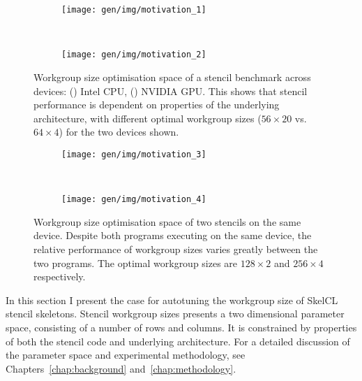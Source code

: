 \begin{figure}
\centering
\begin{subfigure}[h]{.49\textwidth}
\centering
\texttt{[image: gen/img/motivation\_1]}
\vspace{-1.5em} %
\caption{}
\label{fig:motivation-1}
\end{subfigure}
~%
\begin{subfigure}[h]{.49\textwidth}
\centering
\texttt{[image: gen/img/motivation\_2]}
\vspace{-1.5em} %
\caption{}
\label{fig:motivation-2}
\end{subfigure}
\caption[Workgroup size optimisation space across devices]{%
  Workgroup size optimisation space of a stencil benchmark across
  devices: () Intel CPU,
  () NVIDIA GPU. This shows that stencil
  performance is dependent on properties of the underlying
  architecture, with different optimal workgroup sizes ($56 \times 20$
  vs.\ $64 \times 4$) for the two devices shown.%
}
\label{fig:motivation-arch}
\end{figure}

\begin{figure}
\begin{subfigure}[h]{.49\textwidth}
\centering
\texttt{[image: gen/img/motivation\_3]}
\vspace{-1.5em} %
\caption{}
\label{fig:motivation-3}
\end{subfigure}
~%
\begin{subfigure}[h]{.49\textwidth}
\centering
\texttt{[image: gen/img/motivation\_4]}
\vspace{-1.5em} %
\caption{}
\label{fig:motivation-4}
\end{subfigure}
\caption[Workgroup size optimisation space across stencils]{%
  Workgroup size optimisation space of two stencils on the same
  device. Despite both programs executing on the same device, the
  relative performance of workgroup sizes varies greatly between the
  two programs. The optimal workgroup sizes are $128\times2$ and
  $256\times4$ respectively.%
}
\label{fig:motivation-prog}
\end{figure}

In this section I present the case for autotuning the workgroup size
of SkelCL stencil skeletons. Stencil workgroup sizes presents a two
dimensional parameter space, consisting of a number of rows and
columns. It is constrained by properties of both the stencil code and
underlying architecture. For a detailed discussion of the parameter
space and experimental methodology, see Chapters~\ref{chap:background}
and~\ref{chap:methodology}.

